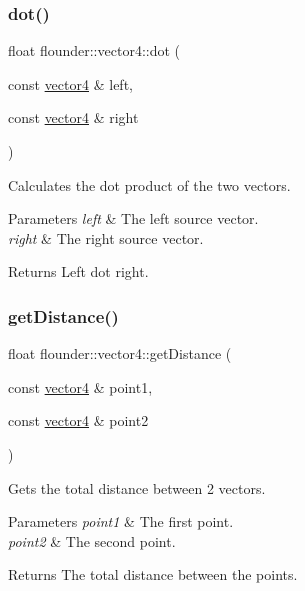\subsubsection{\texorpdfstring{dot()}{dot()}}
{\footnotesize\ttfamily float flounder\+::vector4\+::dot (\begin{DoxyParamCaption}\item[{const \hyperlink{classflounder_1_1vector4}{vector4} \&}]{left,  }\item[{const \hyperlink{classflounder_1_1vector4}{vector4} \&}]{right }\end{DoxyParamCaption})\hspace{0.3cm}{\ttfamily [static]}}



Calculates the dot product of the two vectors. 


\begin{DoxyParams}{Parameters}
{\em left} & The left source vector. \\
\hline
{\em right} & The right source vector. \\
\hline
\end{DoxyParams}
\begin{DoxyReturn}{Returns}
Left dot right. 
\end{DoxyReturn}
\mbox{\label{classflounder_1_1vector4_a24128e65e05cc5430c905349b859dfc1}} 
\subsubsection{\texorpdfstring{get\+Distance()}{getDistance()}}
{\footnotesize\ttfamily float flounder\+::vector4\+::get\+Distance (\begin{DoxyParamCaption}\item[{const \hyperlink{classflounder_1_1vector4}{vector4} \&}]{point1,  }\item[{const \hyperlink{classflounder_1_1vector4}{vector4} \&}]{point2 }\end{DoxyParamCaption})\hspace{0.3cm}{\ttfamily [static]}}



Gets the total distance between 2 vectors. 


\begin{DoxyParams}{Parameters}
{\em point1} & The first point. \\
\hline
{\em point2} & The second point. \\
\hline
\end{DoxyParams}
\begin{DoxyReturn}{Returns}
The total distance between the points. 
\end{DoxyReturn}
\mbox{\label{classflounder_1_1vector4_a09dce41520478186f5afd2bef8290776}} 
